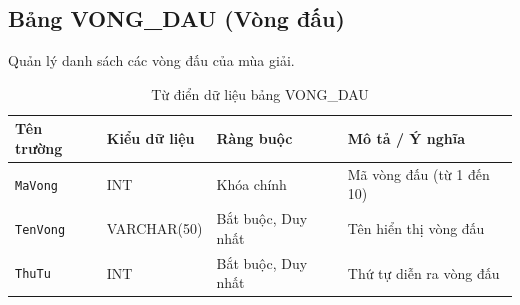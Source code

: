 \subsection{Bảng VONG\_DAU (Vòng đấu)}
Quản lý danh sách các vòng đấu của mùa giải.
\begin{table}[H]
\centering
\small
\begin{tabular}{|l|l|l|p{6cm}|}
\hline
\textbf{Tên trường} & \textbf{Kiểu dữ liệu} & \textbf{Ràng buộc} & \textbf{Mô tả / Ý nghĩa} \\ \hline
\texttt{MaVong} & INT & Khóa chính & Mã vòng đấu (từ 1 đến 10) \\ \hline
\texttt{TenVong} & VARCHAR(50) & Bắt buộc, Duy nhất & Tên hiển thị vòng đấu \\ \hline
\texttt{ThuTu} & INT & Bắt buộc, Duy nhất & Thứ tự diễn ra vòng đấu \\ \hline
\end{tabular}
\caption{Từ điển dữ liệu bảng VONG\_DAU}
\end{table}

